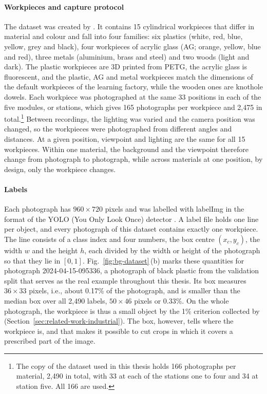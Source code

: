 \paragraph{Workpieces and capture protocol}
The dataset was created by \citet*{schneidereitYOLOv8}. It contains 15 cylindrical workpieces that differ in
material and colour and fall into four families: six plastics (white, red, blue,
yellow, grey and black), four workpieces of acrylic glass (AG; orange, yellow, blue and
red), three metals (aluminium, brass and steel) and two woods (light and dark). The plastic
workpieces are 3D printed from PETG, the acrylic glass is fluorescent, and the plastic,
AG and metal workpieces match the dimensions of the default workpieces of the learning
factory, while the wooden ones are knothole dowels. Each
workpiece was photographed at the same 33 positions in each of the five modules, or
stations, which gives 165 photographs per workpiece and 2,475 in
total.\footnote{The copy of the dataset used in this thesis holds 166 photographs per
material, 2,490 in total, with 33 at each of the stations one to four and 34 at station
five. All 166 are used.} Between recordings, the lighting was varied and the camera
position was changed, so the workpieces were photographed from different angles and
distances. At a given position, viewpoint and lighting are the same for all 15
workpieces. Within one material, the background and the viewpoint therefore change from
photograph to photograph, while across materials at one position, by design, only the
workpiece changes.

\paragraph{Labels}
Each photograph has $960 \times 720$ pixels and was labelled with labelImg in the format
of the YOLO (You Only Look Once) detector \citep{redmon2016yolo}. A label file holds one
line per object, and every photograph of this dataset contains exactly one workpiece.
The line consists of a class index and four numbers, the box centre $(x_c, y_c)$, the
width $w$ and the height $h$, each divided by the width or height of the photograph so
that they lie in $[0,1]$. Fig.~\ref{fig:bg-dataset}\,(b) marks these quantities for
photograph 2024-04-15-095336, a photograph of black plastic from the validation split
that serves as the real example throughout this thesis. Its box measures
$36 \times 33$ pixels, i.e., about 0.17\% of the photograph, and is smaller than the
median box over all 2,490 labels, $50 \times 46$ pixels or 0.33\%. On the whole
photograph, the workpiece is thus a small object by the 1\% criterion collected by
\citet{nikouei2025smallobject} (Section~\ref{sec:related-work-industrial}).
The box, however, tells where the workpiece is, and that makes it possible to cut crops
in which it covers a prescribed part of the image.

